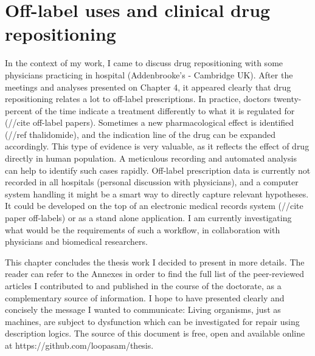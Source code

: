\section{Off-label uses and clinical drug repositioning}
In the context of my work, I came to discuss drug repositioning with some physicians practicing in hospital (Addenbrooke's - Cambridge UK). After the meetings and analyses presented on Chapter 4, it appeared clearly that drug repositioning relates a lot to off-label prescriptions. In practice, doctors twenty-percent of the time indicate a treatment differently to what it is regulated for (//cite off-label papers). Sometimes a new pharmacological effect is identified (//ref thalidomide), and the indication line of the drug can be expanded accordingly. This type of evidence is very valuable, as it reflects the effect of drug directly in human population. A meticulous recording and automated analysis can help to identify such cases rapidly. Off-label prescription data is currently not recorded in all hospitals (personal discussion with physicians), and a computer system handling it might be a smart way to directly capture relevant hypotheses. It could be developed on the top of an electronic medical records system (//cite paper off-labels) or as a stand alone application. I am currently investigating what would be the requirements of such a workflow, in collaboration with physicians and biomedical researchers.

\hrulefill

This chapter concludes the thesis work I decided to present in more details. The reader can refer to the Annexes in order to find the full list of the peer-reviewed articles I contributed to and published in the course of the doctorate, as a complementary source of information. I hope to have presented clearly and concisely the message I wanted to communicate: Living organisms, just as machines, are subject to dysfunction which can be investigated for repair using description logics. The source of this document is free, open and available online at https://github.com/loopasam/thesis.

